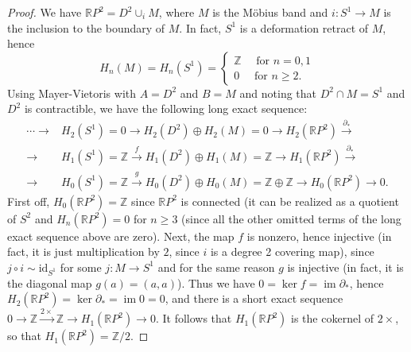 \documentclass[12pt,a4paper]{article}
\newcommand{\R}{\mathbb{R}}
\newcommand{\Z}{\mathbb{Z}}
\newcommand{\id}{\mathrm{id}}
\DeclareMathOperator{\im}{im}
\newcommand{\dd}{\partial}
\begin{document}
\ex\mbox{} 
\begin{proof}
We have $\R P^2=D^2\cup_i M$, where $M$ is the Möbius band and $i:S^1\to M$ is the inclusion to the boundary of $M$. In fact, $S^1$ is a deformation retract of $M$, hence $$H_n(M)=H_n(S^1)=
\begin{cases}
\Z \quad \text{ for } n=0,1\\
0 \quad \text{ for } n\geq 2.
\end{cases}$$
Using Mayer-Vietoris with $A=D^2$ and $B=M$ and noting that $D^2\cap M =S^1$ and $D^2$ is contractible, we have the following long exact sequence:
\begin{equation*}
\begin{split}
\cdots\to &H_2(S^1)=0\to H_2(D^2)\oplus H_2(M)=0\to H_2(\R P^2)\xrightarrow{\dd_*} \\
\to  &H_{1}(S^1)=\Z\xrightarrow{f}
H_1(D^2)\oplus H_1(M)=\Z \to
H_1(\R P^2) \xrightarrow{\dd_*} \\
\to & H_0(S^1)=\Z\xrightarrow{g} H_0(D^2)\oplus H_0(M)=\Z\oplus\Z\to H_0(\R P^2) \to 0.
\end{split}
\end{equation*}
First off, $H_0(\R P^2)=\Z$ since $\R P^2$ is connected (it can be realized as a quotient of $S^2$ and $H_n(\R P^2)=0$ for $n\geq 3$ (since all the other omitted terms of the long exact sequence above are zero).  Next, the map $f$ is nonzero, hence injective (in fact, it is just multiplication by $2$, since $i$ is a degree 2 covering map), since $j\circ i \sim \id_{S^1}$ for some $j:M\to S^1$ and for the same reason $g$ is injective (in fact, it is the diagonal map $g(a)=(a,a)$). Thus we have $0=\ker f=\im \dd _*$, hence $H_2(\R P^2)=\ker \dd_*=\im 0=0$, and there is a short exact sequence $0\to\Z\xrightarrow{2\times}\Z\to H_1(\R P^2)\to 0.$ It follows that $H_1(\R P^2)$ is the cokernel of $2\times$, so that $H_1(\R P^2)=\Z/2$.
\end{proof}
\end{document}
